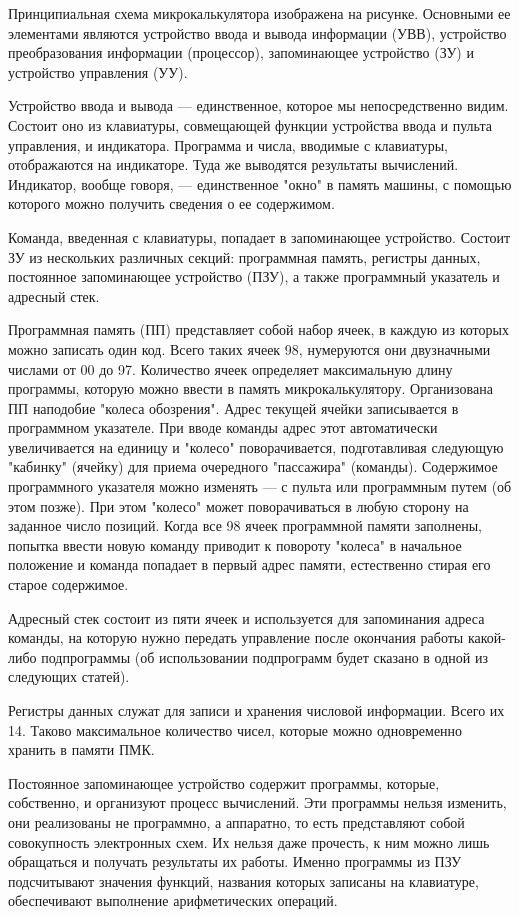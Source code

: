 \documentclass[11pt,a4paper,oneside]{article}
\begin{document}
Принципиальная схема микрокалькулятора изображена на рисунке. Основными ее элементами являются устройство ввода и вывода информации (УВВ), устройство преобразования информации (процессор), запоминающее устройство (ЗУ) и устройство управления (УУ).

Устройство ввода и вывода — единственное, которое мы непосредственно видим. Состоит оно из клавиатуры, совмещающей функции устройства ввода и пульта управления, и индикатора. Программа и числа, вводимые с клавиатуры, отображаются на индикаторе. Туда же выводятся результаты вычислений. Индикатор, вообще говоря, — единственное "окно" в память машины, с помощью которого можно получить сведения о ее содержимом.

Команда, введенная с клавиатуры, попадает в запоминающее устройство. Состоит ЗУ из нескольких различных секций: программная память, регистры данных, постоянное запоминающее устройство (ПЗУ), а также программный указатель и адресный стек.

Программная память (ПП) представляет собой набор ячеек, в каждую из которых можно записать один код. Всего таких ячеек 98, нумеруются они двузначными числами  от 00 до 97. Количество ячеек определяет максимальную длину программы, которую можно ввести в память микрокалькулятору. Организована ПП наподобие "колеса обозрения". Адрес текущей ячейки записывается в программном указателе. При вводе команды адрес этот автоматически увеличивается на единицу и "колесо" поворачивается, подготавливая следующую "кабинку" (ячейку) для приема очередного "пассажира" (команды). Содержимое программного указателя можно изменять — с пульта или программным путем (об этом позже). При этом "колесо" может поворачиваться в любую сторону на заданное число позиций. Когда все 98 ячеек программной памяти заполнены, попытка ввести новую команду приводит к повороту "колеса" в начальное положение и команда попадает в первый адрес памяти, естественно стирая его старое содержимое.

Адресный стек состоит из пяти ячеек и используется для запоминания адреса команды, на которую нужно передать управление после окончания работы какой-либо подпрограммы (об использовании подпрограмм будет сказано в одной из следующих статей).

Регистры данных служат для записи и хранения числовой информации. Всего их 14. Таково максимальное количество чисел, которые можно одновременно хранить в памяти ПМК.

Постоянное запоминающее устройство содержит программы, которые, собственно, и организуют процесс вычислений. Эти программы нельзя изменить, они реализованы не программно, а аппаратно, то есть представляют собой совокупность электронных схем. Их нельзя даже прочесть, к ним можно лишь обращаться и получать результаты их работы. Именно программы из ПЗУ подсчитывают значения функций, названия которых записаны на клавиатуре, обеспечивают выполнение арифметических операций.
\end{document}
